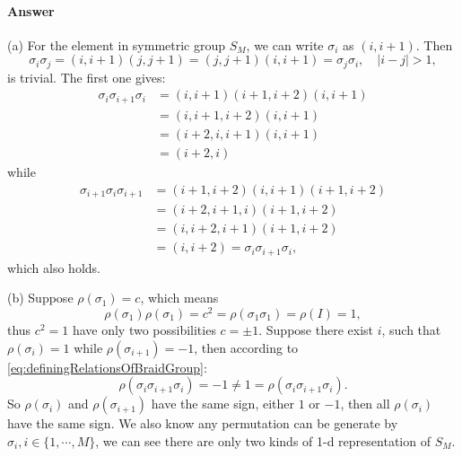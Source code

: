 \documentclass{book}
\begin{document}
\paragraph{Answer}
(a) For the element in symmetric group $S_{M}$, we can write $\sigma _{i}$ as $( i,i+1)$. Then
\begin{equation*}
\sigma _{i} \sigma _{j} =( i,i+1)( j,j+1) =( j,j+1)( i,i+1) =\sigma _{j} \sigma _{i} ,\quad |i-j| >1,
\end{equation*}
is trivial. The first one gives:
\begin{equation*}
\begin{aligned}
\sigma _{i} \sigma _{i+1} \sigma _{i} & =( i,i+1)( i+1,i+2)( i,i+1)\\
 & =( i,i+1,i+2)( i,i+1)\\
 & =( i+2,i,i+1)( i,i+1)\\
 & =( i+2,i)
\end{aligned}
\end{equation*}
while
\begin{equation*}
\begin{aligned}
\sigma _{i+1} \sigma _{i} \sigma _{i+1} & =( i+1,i+2)( i,i+1)( i+1,i+2)\\
 & =( i+2,i+1,i)( i+1,i+2)\\
 & =( i,i+2,i+1)( i+1,i+2)\\
 & =( i,i+2) =\sigma _{i} \sigma _{i+1} \sigma _{i} ,
\end{aligned}
\end{equation*}
which also holds.

(b) Suppose $\rho ( \sigma _{1}) =c$, which means
\begin{equation*}
\rho ( \sigma _{1}) \rho ( \sigma _{1}) =c^{2} =\rho ( \sigma _{1} \sigma _{1}) =\rho ( I) =1,
\end{equation*}
thus $c^{2} =1$ have only two possibilities $c=\pm 1$. Suppose there exist $i$, such that $\rho ( \sigma _{i}) =1$ while $\rho ( \sigma _{i+1}) =-1$, then according to \eqref{eq:definingRelationsOfBraidGroup}:
\begin{equation*}
\rho ( \sigma _{i} \sigma _{i+1} \sigma _{i}) =-1\neq 1=\rho ( \sigma _{i} \sigma _{i+1} \sigma _{i}) .
\end{equation*}
So $\rho ( \sigma _{i})$ and $\rho ( \sigma _{i+1})$ have the same sign, either $1$ or $-1$, then all $\rho ( \sigma _{i})$ have the same sign. We also know any permutation can be generate by $\sigma _{i} ,i\in \{1,\cdots ,M\}$, we can see there are only two kinds of 1-d representation of $S_{M}$. 
\end{document}
